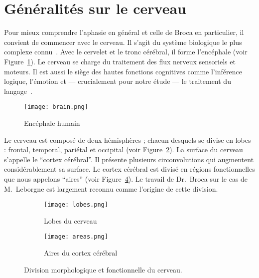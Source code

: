 \section{Généralités sur le cerveau}

Pour mieux comprendre l'aphasie en général et celle de Broca en particulier, 
il convient de commencer avec le cerveau.
Il s'agit du système biologique le plus complexe connu~\cite{}.
Avec le cervelet et le tronc cérébral, il forme l'encéphale (voir Figure~\ref{fig:brain}).
Le cerveau se charge du traitement des flux nerveux sensoriels et moteurs.
Il est aussi le siège des hautes fonctions cognitives comme l'inférence logique, l'émotion 
et --- crucialement pour notre étude --- le traitement du langage~\cite{}.

\begin{figure}[htb]
    \begin{center}
        \texttt{[image: brain.png]}
    \end{center}
    \caption{Encéphale humain}
    \label{fig:brain}
\end{figure}

Le cerveau est composé de deux hémisphères ; chacun desquels se divise en lobes : 
frontal, temporal, pariétal et occipital (voir Figure~\ref{fig:lobes}).
La surface du cerveau s'appelle le ``cortex cérébral''.
Il présente plusieurs circonvolutions qui augmentent considérablement sa surface.
Le cortex cérébral est divisé en régions fonctionnelles que nous appelons ``aires''
(voir Figure~\ref{fig:brain-areas}).
Le travail de Dr.~Broca sur le cas de M.~Leborgne est largement reconnu comme l'origine de cette division.


\begin{figure}[htb]
    \begin{center}

        \begin{subfigure}{.38\linewidth}
            \texttt{[image: lobes.png]}
            \caption{Lobes du cerveau~\cite{}}
            \label{fig:lobes}
        \end{subfigure}
        \begin{subfigure}{.52\linewidth}
            \texttt{[image: areas.png]}
            \caption{Aires du cortex cérébral~\cite{}}
            \label{fig:brain-areas}
        \end{subfigure}
        
        
    \end{center}
    \caption{Division morphologique et fonctionnelle du cerveau.}
\end{figure}

